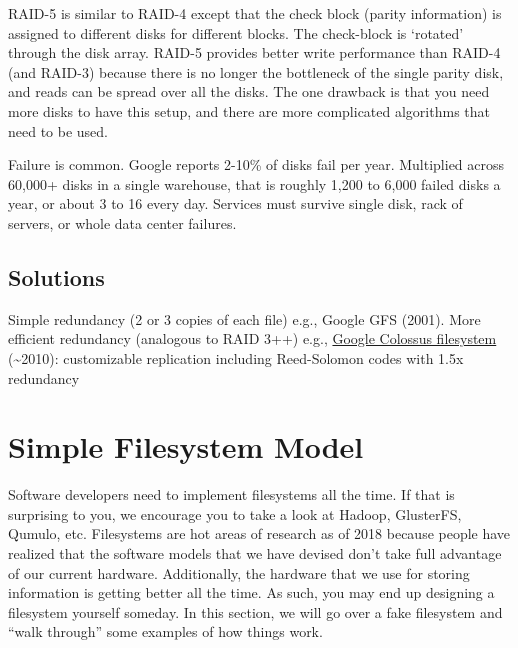 RAID-5 is similar to RAID-4 except that the check block (parity information) is assigned to different disks for different blocks.
The check-block is `rotated' through the disk array.
RAID-5 provides better write performance than RAID-4 (and RAID-3) because there is no longer the bottleneck of the single parity disk, and reads can be spread over all the disks.
The one drawback is that you need more disks to have this setup, and there are more complicated algorithms that need to be used.

Failure is common.
Google reports 2-10\% of disks fail per year.
Multiplied across 60,000+ disks in a single warehouse, that is roughly 1,200 to 6,000 failed disks a year, or about 3 to 16 every day.
Services must survive single disk, rack of servers, or whole data center failures.

\subsection{Solutions}
Simple redundancy (2 or 3 copies of each file) e.g., Google GFS (2001).
More efficient redundancy (analogous to RAID 3++) e.g., \href{https://web.archive.org/web/20160910131226/http://static.googleusercontent.com/media/research.google.com/en/us/university/relations/facultysummit2010/storage_architecture_and_challenges.pdf}{Google Colossus filesystem} (\textasciitilde{}2010): customizable replication including Reed-Solomon codes with 1.5x redundancy

\section{Simple Filesystem Model}

Software developers need to implement filesystems all the time.
If that is surprising to you, we encourage you to take a look at Hadoop, GlusterFS, Qumulo, etc.
Filesystems are hot areas of research as of 2018 because people have realized that the software models that we have devised don't take full advantage of our current hardware.
Additionally, the hardware that we use for storing information is getting better all the time.
As such, you may end up designing a filesystem yourself someday.
In this section, we will go over a fake filesystem and ``walk through'' some examples of how things work.

